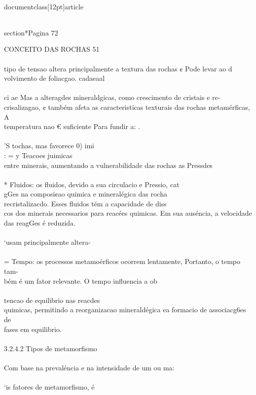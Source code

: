 \\documentclass[12pt]{article}
\begin{document}
\\section*{Pagina 72}

CONCEITO DAS ROCHAS 51\\
\\
tipo de tensao altera principalmente a textura das rochas ¢ Pode levar ao d\\
volvimento de foliacgao. cadaeaal\\
\\
ci ae Mas a alteragdes mineraldgicas, como crescimento de cristais e re-\\
crisalizagao, ¢ também afeta as caracteristicas texturais das rochas metamérficas, A\\
temperatura nao € suficiente Para fundir a: .\\
\\
'S tochas, mas favorece 0) imi\\
: = y Teacoes juimicas\\
entre minerais, aumentando a vulnerabilidade das rochas as Pressdes\\
\\
* Fluidos: os fluidos, devido a sua circulacio e Pressio, cat\\
gGes na composi¢ao quimica e mineralégica das rocha\\
recristalizacdo. Esses fluidos tém a capacidade de diss\\
cos dos minerais necessarios para reacées quimicas. Em sua auséncia, a velocidade\\
das reagGes é reduzida.\\
\\
‘usam principalmente altera-\\
\\
= Tempo: os processos metamoérficos ocorrem lentamente, Portanto, o tempo tam-\\
bém é um fator relevante. O tempo influencia a ob\\
\\
tencao de equilibrio nas reacdes\\
quimicas, permitindo a reorganizacao mineraldégica ea formacio de associacg6es de\\
fases em equilibrio.\\
\\
3.2.4.2 Tipos de metamorfismo\\
\\
Com base na prevaléncia e na intensidade de um ou ma:\\
\\
‘is fatores de metamorfismo, é\\
\end{document}
